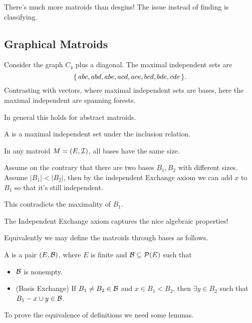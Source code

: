 \documentclass[12pt]{memoir}
\begin{document}
There's much more matroids than desgins! The issue instead of finding is classifying.

\subsection{Graphical Matroids}

\begin{Ex}
    Consider the graph $C_4$ plus a diagonal. The maximal independent sets are 
    $$\{\,abc,abd,abe,acd,ace,bcd,bde,cde\,\}.$$
    Contrasting with vectors, where maximal independent sets are bases, here the maximal independent are spanning forests.
\end{Ex}

In general this holds for abstract matroids.

\begin{Def}
    A  is a maximal independent set under the inclusion relation. 
\end{Def}

\begin{Lem}
    In any matroid $M=(E,\mathcal{I})$, all bases have the same size.
\end{Lem}

\begin{ptcbp}
Assume on the contrary that there are two bases $B_1,B_2$ with different sizes. Assume $|B_1|<|B_2|$, then by the independent Exchange axiom we can add $x$ to $B_1$ so that it's still independent.\par 
This contradicts the maximality of $B_1$.
\end{ptcbp}

The Independent Exchange axiom captures the nice algebraic properties!\par 
Equivalently we may define the matroids through bases as follows.

\begin{Def}
    A  is a pair $(E,\mathcal{B})$, where $E$ is finite and $\mathcal{B}\subseteq\mathcal{P}(E)$ such that 
    \begin{itemize}
        \item $\mathcal{B}$ is nonempty.
        \item (Basis Exchange) If $B_1\neq B_2\in\mathcal{B}$ and $x\in B_1\less B_2$, then $\exists y\in B_2$ such that $B_1-x\cup y\in\mathcal{B}$.
    \end{itemize}
\end{Def}

To prove the equivalence of definitions we need some lemmas.
\end{document}

